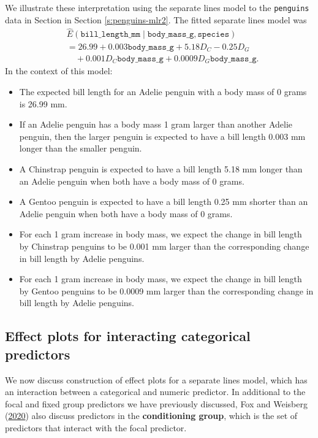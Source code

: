 \documentclass[
]{book}
\providecommand{\tightlist}{%
  \setlength{\itemsep}{0pt}\setlength{\parskip}{0pt}}
\theoremstyle{definition}
\theoremstyle{definition}
\theoremstyle{definition}
\theoremstyle{definition}
\theoremstyle{remark}
\begin{document}
We illustrate these interpretation using the separate lines model to the
\texttt{penguins} data in Section in Section \ref{s:penguins-mlr2}. The fitted
separate lines model was \[
\begin{aligned}
&\hat{E}(\mathtt{bill\_length\_mm} \mid \mathtt{body\_mass\_g}, \mathtt{species}) \\
&= 26.99 + 0.003 \mathtt{body\_mass\_g} + 5.18 D_C - 0.25 D_G \\
&\quad + 0.001 D_C \mathtt{body\_mass\_g} + 0.0009 D_G \mathtt{body\_mass\_g}.
\end{aligned}
\label{eq:sl-refit-interp}
\] In the context of this model:

\begin{itemize}
\tightlist
\item
  The expected bill length for an Adelie penguin with a body mass of 0
  grams is 26.99 mm.
\item
  If an Adelie penguin has a body mass 1 gram larger than another
  Adelie penguin, then the larger penguin is expected to have a bill
  length 0.003 mm longer than the smaller penguin.
\item
  A Chinstrap penguin is expected to have a bill length 5.18 mm longer
  than an Adelie penguin when both have a body mass of 0 grams.
\item
  A Gentoo penguin is expected to have a bill length 0.25 mm shorter
  than an Adelie penguin when both have a body mass of 0 grams.
\item
  For each 1 gram increase in body mass, we expect the change in bill
  length by Chinstrap penguins to be 0.001 mm larger than the
  corresponding change in bill length by Adelie penguins.
\item
  For each 1 gram increase in body mass, we expect the change in bill
  length by Gentoo penguins to be 0.0009 mm larger than the
  corresponding change in bill length by Adelie penguins.
\end{itemize}

\hypertarget{effect-plots-for-interacting-categorical-predictors}{%
\subsection{Effect plots for interacting categorical predictors}\label{effect-plots-for-interacting-categorical-predictors}}

We now discuss construction of effect plots for a separate lines model,
which has an interaction between a categorical and numeric predictor. In
additional to the focal and fixed group predictors we have previously
discussed, Fox and Weisberg (\protect\hyperlink{ref-fox2020predictor}{2020}) also discuss predictors in the
\textbf{conditioning group}, which is the set of predictors that interact
with the focal predictor.
\end{document}
